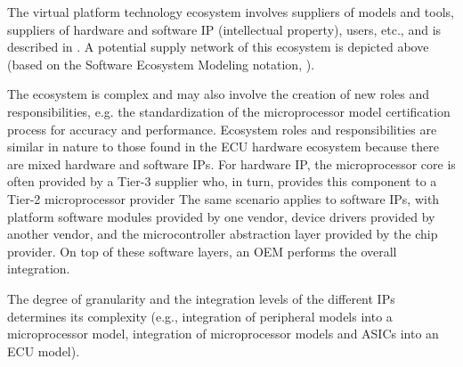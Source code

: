 The virtual platform technology ecosystem involves suppliers of models and tools, suppliers of hardware and software IP (intellectual property), users, etc., and is described in \cite{Knauss2014d}.
A potential supply network of this ecosystem is depicted above (based on the Software Ecosystem Modeling notation, \cite{Boucharas2009}).

The ecosystem is complex and may also involve the creation of new roles and responsibilities, e.g. the standardization of the microprocessor model certification process for accuracy and performance.
Ecosystem roles and responsibilities are similar in nature to those found in the ECU hardware ecosystem because there are mixed hardware and software IPs.
For hardware IP, the microprocessor core is often provided by a Tier-3 supplier who, in turn, provides this component to a Tier-2 microprocessor provider
The same scenario applies to software IPs, with platform software modules provided by one vendor, device drivers provided by another vendor, and the microcontroller abstraction layer provided by the chip provider.
On top of these software layers, an OEM performs the overall integration.

The degree of granularity and the integration levels of the different IPs determines its complexity (e.g., integration of peripheral models into a microprocessor model, integration of microprocessor models and ASICs into an ECU model).

